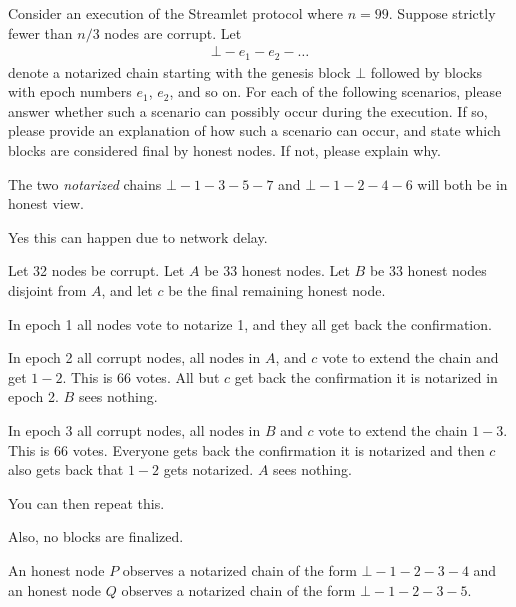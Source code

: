 \documentclass[12pt, letterpaper]{article}
\begin{document}
\begin{problem}{}
    Consider an execution of the Streamlet protocol where $n = 99$. Suppose strictly fewer than $n / 3$ nodes are corrupt. 
Let 
\begin{align*}
    \bot - e_1 - e_2 - \ldots
\end{align*}
denote a notarized chain starting with the genesis block $\bot$ followed by blocks 
with epoch numbers $e_1$, $e_2$, and so on.
For each of the following scenarios, please answer whether such a scenario can possibly occur during the execution. If so, please provide an explanation of how such a scenario can occur, and state which blocks are considered final by honest nodes. If not, please explain why. 
\end{problem}
\begin{subproblem}{}
    The two \emph{notarized} chains $\bot - 1 - 3 - 5 - 7$ and $\bot - 1 - 2 - 4 - 6$ will both be in honest view.
\end{subproblem}
\begin{problemproof}
    Yes this can happen due to network delay.

    Let 32 nodes be corrupt. Let $A$ be 33 honest nodes. Let $B$ be 33 honest nodes disjoint from $A$, and let $c$ be the final remaining honest node.

    In epoch 1 all nodes vote to notarize 1, and they all get back the confirmation.

    In epoch 2 all corrupt nodes, all nodes in $A$, and $c$ vote to extend the chain and get $1-2$. This is 66 votes. All but $c$ get back the confirmation it is notarized in epoch 2. 
    $B$ sees nothing.

    In epoch 3 all corrupt nodes, all nodes in $B$ and $c$ vote to extend the chain $1-3$.
    This is 66 votes. Everyone gets back the confirmation it is notarized and then $c$ also gets back that $1-2$ gets notarized. $A$ sees nothing.

    You can then repeat this.

    Also, no blocks are finalized.
\end{problemproof}
\begin{subproblem}{}
    An honest node $P$ observes a notarized chain of the form $\bot - 1 - 2 - 3 - 4$ and an honest node $Q$ observes a notarized chain of the form $\bot - 1 - 2 - 3 - 5$.
\end{subproblem}
\end{document}

